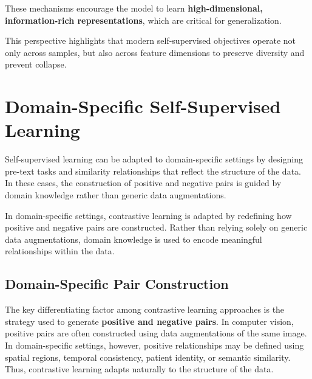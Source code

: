 \documentclass{article}
\begin{document}
These mechanisms encourage the model to learn \textbf{high-dimensional, information-rich representations}, which are critical for generalization.

This perspective highlights that modern self-supervised objectives operate not only across samples, but also across feature dimensions to preserve diversity and prevent collapse.

\section{Domain-Specific Self-Supervised Learning}

Self-supervised learning can be adapted to domain-specific settings by designing pre-text tasks and similarity relationships that reflect the structure of the data. In these cases, the construction of positive and negative pairs is guided by domain knowledge rather than generic data augmentations.

In domain-specific settings, contrastive learning is adapted by redefining how positive and negative pairs are constructed. Rather than relying solely on generic data augmentations, domain knowledge is used to encode meaningful relationships within the data.


\subsection{Domain-Specific Pair Construction}

The key differentiating factor among contrastive learning approaches is the strategy used to generate \textbf{positive and negative pairs}. In computer vision, positive pairs are often constructed using data augmentations of the same image. In domain-specific settings, however, positive relationships may be defined using spatial regions, temporal consistency, patient identity, or semantic similarity. Thus, contrastive learning adapts naturally to the structure of the data.
\end{document}
